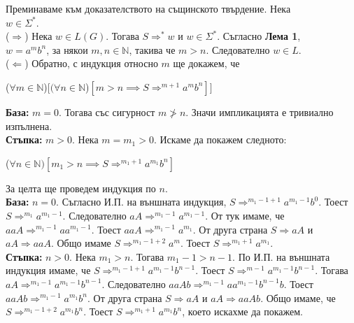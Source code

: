 \documentclass{article}
\begin{document}
        Преминаваме към доказателството на същинското твърдение. Нека \\ $w \in \Sigma^*$. \\
        ($\Rightarrow$) Нека $w \in L(G)$. Тогава $S \Rightarrow^* w$ и $w \in \Sigma^*$. 
        Съгласно \textbf{Лема 1}, \\ $w = a^mb^n$, за някои $m,n \in \mathbb{N}$, такива че 
        $m > n$. Следователно $w \in L$. \\
        ($\Leftarrow$) Обратно, с индукция относно $m$ ще докажем, че \\
        \begin{center}
            ($\forall m \in \mathbb{N}$)$[(\forall n \in \mathbb{N}$)$[m > n \implies S \Rightarrow^{m+1} a^mb^n]]$
        \end{center}
        \textbf{База:} $m = 0$. Тогава със сигурност $m \not > n$. Значи импликацията
        е тривиално изпълнена. \\
        \vspace{5pt}
        \textbf{Стъпка:} $m > 0$. Нека $m = m_1 > 0$. Искаме да покажем следното: \\
        \begin{center}
            ($\forall n \in \mathbb{N})[m_1 > n \implies S \Rightarrow^{{m_1}+1} a^{m_1}b^n]$
        \end{center}
        За целта ще проведем индукция по $n$. \\
        \vspace{5pt}
        \hspace{15pt} \textbf{База:} $n=0$. Съгласно И.П. на външната индукция, 
        $S \Rightarrow^{m_1-1+1} a^{m_1-1}b^0$. Тоест $S \Rightarrow^{m_1} a^{m_1-1}$. Следователно
        $aA \Rightarrow^{m_1-1} a^{m_1-1}$. От тук имаме, че $aaA \Rightarrow^{m_1-1} aa^{m_1-1}$.
        Тоест $aaA \Rightarrow^{m_1-1} a^{m_1}$. От друга страна $S \Rightarrow aA$ и $aA \Rightarrow aaA$.
        Общо имаме $S \Rightarrow^{m_1-1+2} a^m$. Тоест $S \Rightarrow^{m_1+1} a^{m_1}$. \\
        \hspace{15pt} \textbf{Стъпка:} $n > 0$. Нека $m_1 > n$. Тогава $m_1-1 > n-1$. 
        По И.П. на външната индукция имаме, че $S \Rightarrow^{m_1-1+1}a^{m_1-1}b^{n-1}$.
        Тоест $S \Rightarrow^{m-1}a^{m_1-1}b^{n-1}$. Тогава $aA \Rightarrow^{m_1-1} a^{m_1-1}b^{n-1}$. 
        Следователно $aaAb \Rightarrow^{m_1-1} aa^{m_1-1}b^{n-1}b$. Тоест 
        $aaAb \Rightarrow^{m_1-1}a^{m_1}b^n$. От друга страна $S \Rightarrow aA$ и 
        $aA \Rightarrow aaAb$. Общо имаме, че $S \Rightarrow^{m_1-1+2} a^{m_1}b^n$. 
        Тоест $S \Rightarrow^{m_1+1} a^{m_1}b^n$, което искахме да покажем.
\vspace{25pt}
\end{document}

